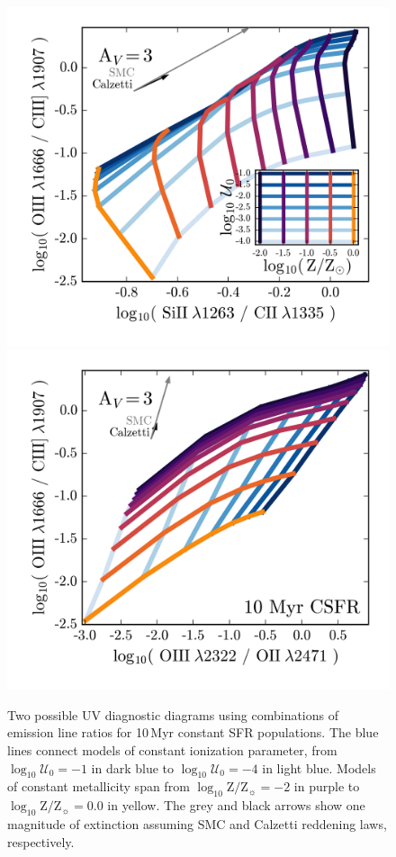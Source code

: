 \documentclass[preprint2,trackchanges]{aastex62}
\newcommand{\Myr}{$\,$Myr\xspace}
\newcommand{\logten}{\ensuremath{\log_{10}}}
\newcommand{\logZeq}[1]{\ensuremath{\logten \mathrm{Z}/\mathrm{Z}_{\sun} = #1}}
\newcommand{\logUeq}[1]{\ensuremath{\logten \mathcal{U}_0 = #1}}
\begin{document}
\begin{figure}
  \begin{center}
    \includegraphics[width=0.495\linewidth]{figs/f10a.png}
    \includegraphics[width=0.495\linewidth]{figs/f10b.png}
    \caption{Two possible UV diagnostic diagrams using combinations of emission line ratios for 10\Myr constant SFR populations. The blue lines connect models of constant ionization parameter, from \logUeq{-1} in dark blue to \logUeq{-4} in light blue. Models of constant metallicity span from \logZeq{-2} in purple to \logZeq{0.0} in yellow. The grey and black arrows show one magnitude of extinction assuming SMC and Calzetti reddening laws, respectively.}
    \label{fig:RatioRatio}
  \end{center}
\end{figure}
\end{document}
